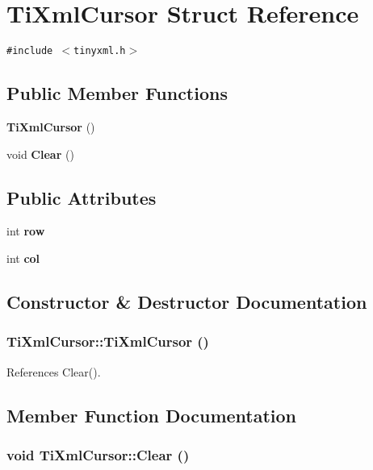 \section{TiXmlCursor Struct Reference}
\label{structTiXmlCursor}
{\tt \#include $<$tinyxml.h$>$}

\subsection*{Public Member Functions}
\begin{CompactItemize}
\item 
{\bf TiXmlCursor} ()
\item 
void {\bf Clear} ()
\end{CompactItemize}
\subsection*{Public Attributes}
\begin{CompactItemize}
\item 
int {\bf row}
\item 
int {\bf col}
\end{CompactItemize}


\subsection{Constructor \& Destructor Documentation}
\subsubsection[TiXmlCursor]{\setlength{\rightskip}{0pt plus 5cm}TiXmlCursor::TiXmlCursor ()\hspace{0.3cm}{\tt  [inline]}}\label{structTiXmlCursor_7ad233928a675f0271eb440b150e3ff1}




References Clear().

\subsection{Member Function Documentation}
\subsubsection[Clear]{\setlength{\rightskip}{0pt plus 5cm}void TiXmlCursor::Clear ()\hspace{0.3cm}{\tt  [inline]}}\label{structTiXmlCursor_1e6fa622b59dafb71b6efe595105dcdd}




